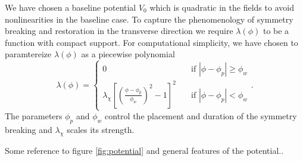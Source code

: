 We have chosen a baseline potential $V_0$ which is quadratic in the fields to avoid nonlinearities in the baseline case.
To capture the phenomenology of symmetry breaking and restoration in the transverse direction we require $\lambda(\phi)$ to be a function with compact support.
For computational simplicity, we have chosen to paramtereize $\lambda(\phi)$ as a piecewise polynomial
\begin{equation} \label{eq:lambda}
  \lambda(\phi) =
  \begin{cases}
    0 & \quad \text{if } |\phi-\phi_p|\ge\phi_w \\
    \lambda_\chi\left[\left(\frac{\phi-\phi_p}{\phi_w}\right)^2 - 1 \right]^2 & \quad \text{if  } |\phi-\phi_p|<\phi_w
  \end{cases}.
\end{equation}
The parameters $\phi_p$ and $\phi_w$ control the placement and duration of the symmetry breaking and $\lambda_\chi$
scales its strength.



Some reference to figure \ref{fig:potential} and general features of the potential..

